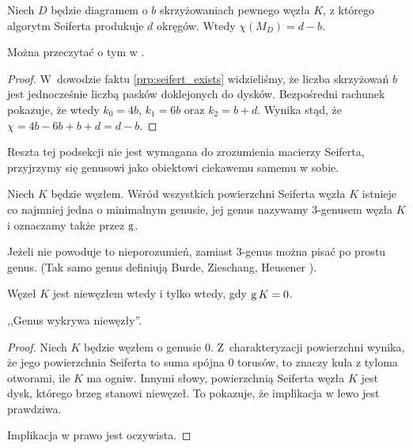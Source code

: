 \begin{proposition}
\label{prp:seifert_euler_characteristics}%
    Niech $D$ będzie diagramem o $b$ skrzyżowaniach pewnego węzła $K$, z którego algorytm Seiferta produkuje $d$ okręgów.
    Wtedy $\chi(M_D) = d - b$.
\end{proposition}

Można przeczytać o tym w \cite[s. 82]{murasugi1996}.

\begin{proof}
    W~dowodzie faktu \ref{prp:seifert_exists} widzieliśmy, że liczba skrzyżowań $b$ jest jednocześnie liczbą pasków doklejonych do dysków.
    Bezpośredni rachunek pokazuje, że wtedy $k_0 = 4b$, $k_1 = 6b$ oraz $k_2 = b+d$.
    Wynika stąd, że $\chi = 4b - 6b + b + d = d - b$.
\end{proof}

Reszta tej podsekcji nie jest wymagana do zrozumienia macierzy Seiferta, przyjrzymy się genusowi jako obiektowi ciekawemu samemu w sobie.

\begin{definition}[3-genus]
    Niech $K$ będzie węzłem.
    Wśród wszystkich powierzchni Seiferta węzła $K$ istnieje co najmniej jedna o minimalnym genusie, jej genus nazywamy 3-genusem węzła $K$ i oznaczamy także przez $\operatorname{g}$.
\end{definition}

Jeżeli nie powoduje to nieporozumień, zamiast 3-genus można pisać po prostu genus.
(Tak samo genus definiują Burde, Zieschang, Heusener \cite[s. 20]{zieschang2014}).

\begin{proposition}
\label{prp:genus_detects_unknot}%
    Węzeł $K$ jest niewęzłem wtedy i tylko wtedy, gdy $\operatorname{g} K = 0$.
\end{proposition}

,,Genus wykrywa niewęzły''.

\begin{proof}
    Niech $K$ będzie węzłem o genusie $0$.
    Z~charakteryzacji powierzchni wynika, że jego powierzchnia Seiferta to suma spójna $0$ torusów, to znaczy kula z tyloma otworami, ile $K$ ma ogniw.
    Innymi słowy, powierzchnią Seiferta węzła $K$ jest dysk, którego brzeg stanowi niewęzeł.
    To pokazuje, że implikacja w lewo jest prawdziwa.

    Implikacja w prawo jest oczywista.
\end{proof}









%


